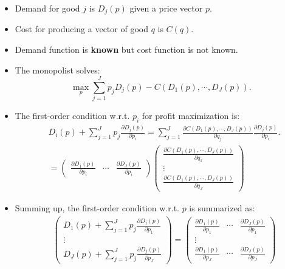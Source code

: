 \documentclass[
]{book}
\begin{document}
\begin{itemize}
\item
  Demand for good \(j\) is \(D_j(p)\) given a price vector \(p\).
\item
  Cost for producing a vector of good \(q\) is \(C(q)\).
\item
  Demand function is \textbf{known} but cost function is not known.
\item
  The monopolist solves:
  \begin{equation}
  \max_{p} \sum_{j = 1}^J p_j D_j(p) - C(D_1(p), \cdots, D_J(p)).
  \end{equation}
\item
  The first-order condition w.r.t. \(p_i\) for profit maximization is:
  \begin{equation}
  \begin{split}
  &D_i(p) +  \sum_{j = 1}^J p_j \frac{\partial D_j(p)}{\partial p_i} = \sum_{j = 1}^J \frac{\partial C(D_1(p), \cdots, D_J(p))}{\partial q_j} \frac{\partial D_j(p)}{\partial p_i}.\\
  &= 
  \begin{pmatrix}
  \frac{\partial D_1(p)}{\partial p_i} & \cdots & \frac{\partial D_J(p)}{\partial p_i}
  \end{pmatrix}
  \begin{pmatrix}
  \frac{\partial C(D_1(p), \cdots, D_J(p))}{\partial q_1}\\
  \vdots\\
  \frac{\partial C(D_1(p), \cdots, D_J(p))}{\partial q_J}
  \end{pmatrix}
  \end{split}
  \end{equation}
\item
  Summing up, the first-order condition w.r.t. \(p\) is summarized as:
  \begin{equation}
  \begin{split}
  &\begin{pmatrix}
   D_1(p) + \sum_{j = 1}^J p_j \frac{\partial D_j(p)}{\partial p_1}\\
   \vdots\\
   D_J(p) + \sum_{j = 1}^J p_j \frac{\partial D_j(p)}{\partial p_J}
  \end{pmatrix} 
  =
  \begin{pmatrix}
  \frac{\partial D_1(p)}{\partial p_1} & \cdots & \frac{\partial D_J(p)}{\partial p_1}\\
  \vdots\\
  \frac{\partial D_1(p)}{\partial p_J} & \cdots & \frac{\partial D_J(p)}{\partial p_J}

\end{pmatrix}
\end{split}
\end{equation}
\end{itemize}
\end{document}
